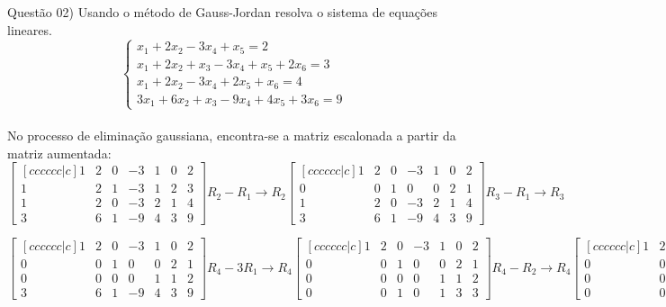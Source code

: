 
\noindent \textcolor{COLOR1}{Questão 02)} Usando o método de Gauss-Jordan resolva o sistema de equações lineares.
\\

\[
    \begin{cases}
        x_1 + 2x_2 - 3x_4 + x_5 = 2              \\
        x_1 + 2x_2 + x_3 - 3x_4 + x_5 + 2x_6 = 3 \\
        x_1 + 2x_2 - 3x_4 + 2x_5 + x_6 = 4       \\
        3x_1 + 6x_2 + x_3 - 9x_4 + 4x_5 + 3x_6 = 9
    \end{cases}
\]
\\


No processo de eliminação gaussiana, encontra-se a matriz escalonada a partir da matriz aumentada:
\\

\[
    \begin{bmatrix}[cccccc|c]
        1 & 2 & 0 & -3 & 1 & 0 & 2 \\
        1 & 2 & 1 & -3 & 1 & 2 & 3 \\
        1 & 2 & 0 & -3 & 2 & 1 & 4 \\
        3 & 6 & 1 & -9 & 4 & 3 & 9
    \end{bmatrix}
    R_2 - R_1 \to R_2
    \begin{bmatrix}[cccccc|c]
        1 & 2 & 0 & -3 & 1 & 0 & 2 \\
        0 & 0 & 1 & 0  & 0 & 2 & 1 \\
        1 & 2 & 0 & -3 & 2 & 1 & 4 \\
        3 & 6 & 1 & -9 & 4 & 3 & 9
    \end{bmatrix}
    R_3 - R_1 \to R_3
\]


\[
    \begin{bmatrix}[cccccc|c]
        1 & 2 & 0 & -3 & 1 & 0 & 2 \\
        0 & 0 & 1 & 0  & 0 & 2 & 1 \\
        0 & 0 & 0 & 0  & 1 & 1 & 2 \\
        3 & 6 & 1 & -9 & 4 & 3 & 9
    \end{bmatrix}
    R_4-3R_1 \to R_4
    \begin{bmatrix}[cccccc|c]
        1 & 2 & 0 & -3 & 1 & 0 & 2 \\
        0 & 0 & 1 & 0  & 0 & 2 & 1 \\
        0 & 0 & 0 & 0  & 1 & 1 & 2 \\
        0 & 0 & 1 & 0  & 1 & 3 & 3
    \end{bmatrix}
    R_4-R_2\to R_4
    \begin{bmatrix}[cccccc|c]
        1 & 2 & 0 & -3 & 1 & 0 & 2 \\
        0 & 0 & 1 & 0  & 0 & 2 & 1 \\
        0 & 0 & 0 & 0  & 1 & 1 & 2 \\
        0 & 0 & 0 & 0  & 1 & 1 & 2
    \end{bmatrix}
\]



